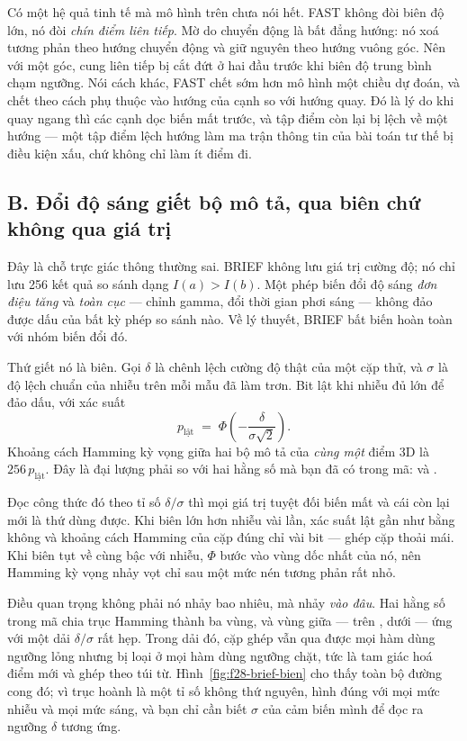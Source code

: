 \documentclass[../../deep_learning.tex]{subfiles}
\begin{document}
Có một hệ quả tinh tế mà mô hình trên chưa nói hết. FAST không đòi biên độ lớn, nó đòi \emph{chín điểm liên tiếp}. Mờ do chuyển động là bất đẳng hướng: nó xoá tương phản theo hướng chuyển động và giữ nguyên theo hướng vuông góc. Nên với một góc, cung liên tiếp bị cắt đứt ở hai đầu trước khi biên độ trung bình chạm ngưỡng. Nói cách khác, FAST chết sớm hơn mô hình một chiều dự đoán, và chết theo cách phụ thuộc vào hướng của cạnh so với hướng quay. Đó là lý do khi quay ngang thì các cạnh dọc biến mất trước, và tập điểm còn lại bị lệch về một hướng --- một tập điểm lệch hướng làm ma trận thông tin của bài toán tư thế bị điều kiện xấu, chứ không chỉ làm ít điểm đi.

\subsection{B. Đổi độ sáng giết bộ mô tả, qua biên chứ không qua giá trị}
Đây là chỗ trực giác thông thường sai. BRIEF không lưu giá trị cường độ; nó chỉ lưu 256 kết quả so sánh dạng \(I(a) > I(b)\). Một phép biến đổi độ sáng \emph{đơn điệu tăng} và \emph{toàn cục} --- chỉnh gamma, đổi thời gian phơi sáng --- không đảo được dấu của bất kỳ phép so sánh nào. Về lý thuyết, BRIEF bất biến hoàn toàn với nhóm biến đổi đó.

Thứ giết nó là biên. Gọi \(\delta\) là chênh lệch cường độ thật của một cặp thử, và \(\sigma\) là độ lệch chuẩn của nhiễu trên mỗi mẫu đã làm trơn. Bit lật khi nhiễu đủ lớn để đảo dấu, với xác suất
\[
p_{\text{lật}} \;=\; \Phi\!\left(-\frac{\delta}{\sigma\sqrt{2}}\right).
\]
Khoảng cách Hamming kỳ vọng giữa hai bộ mô tả của \emph{cùng một} điểm 3D là \(256\,p_{\text{lật}}\). Đây là đại lượng phải so với hai hằng số mà bạn đã có trong mã:  và .

Đọc công thức đó theo tỉ số \(\delta/\sigma\) thì mọi giá trị tuyệt đối biến mất và cái còn lại mới là thứ dùng được. Khi biên lớn hơn nhiễu vài lần, xác suất lật gần như bằng không và khoảng cách Hamming của cặp đúng chỉ vài bit --- ghép cặp thoải mái. Khi biên tụt về cùng bậc với nhiễu, \(\Phi\) bước vào vùng dốc nhất của nó, nên Hamming kỳ vọng nhảy vọt chỉ sau một mức nén tương phản rất nhỏ.

Điều quan trọng không phải nó nhảy bao nhiêu, mà nhảy \emph{vào đâu}. Hai hằng số trong mã chia trục Hamming thành ba vùng, và vùng giữa --- trên , dưới  --- ứng với một dải \(\delta/\sigma\) rất hẹp. Trong dải đó, cặp ghép vẫn qua được mọi hàm dùng ngưỡng lỏng nhưng bị loại ở mọi hàm dùng ngưỡng chặt, tức là tam giác hoá điểm mới và ghép theo túi từ. Hình~\ref{fig:f28-brief-bien} cho thấy toàn bộ đường cong đó; vì trục hoành là một tỉ số không thứ nguyên, hình đúng với mọi mức nhiễu và mọi mức sáng, và bạn chỉ cần biết \(\sigma\) của cảm biến mình để đọc ra ngưỡng \(\delta\) tương ứng.
\end{document}

